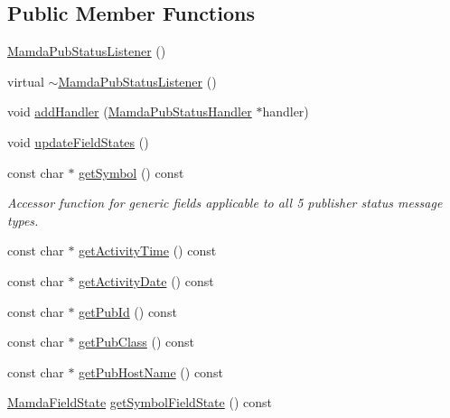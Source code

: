 \subsection*{Public Member Functions}
\begin{CompactItemize}
\item 
\hyperlink{classWombat_1_1MamdaPubStatusListener_85f58413cd22007f86b9b8c061812f05}{Mamda\-Pub\-Status\-Listener} ()
\item 
virtual \hyperlink{classWombat_1_1MamdaPubStatusListener_03f02d6928f876a1d35c39522da47f8d}{$\sim$Mamda\-Pub\-Status\-Listener} ()
\item 
void \hyperlink{classWombat_1_1MamdaPubStatusListener_8fd61b0b01ae58ac9aa0087ef361206c}{add\-Handler} (\hyperlink{classWombat_1_1MamdaPubStatusHandler}{Mamda\-Pub\-Status\-Handler} $\ast$handler)
\item 
void \hyperlink{classWombat_1_1MamdaPubStatusListener_2af5146fb7e9e8b4427e78809c20377a}{update\-Field\-States} ()
\item 
const char $\ast$ \hyperlink{classWombat_1_1MamdaPubStatusListener_6a45bb477632be814f1a3bd00082c06c}{get\-Symbol} () const 
\begin{CompactList}\small\item\em Accessor function for generic fields applicable to all 5 publisher status message types. \item\end{CompactList}\item 
const char $\ast$ \hyperlink{classWombat_1_1MamdaPubStatusListener_ffedad037842c408272dbded18f676f6}{get\-Activity\-Time} () const 
\item 
const char $\ast$ \hyperlink{classWombat_1_1MamdaPubStatusListener_0b14cc9aec4ec454b0095cf4f82fab5e}{get\-Activity\-Date} () const 
\item 
const char $\ast$ \hyperlink{classWombat_1_1MamdaPubStatusListener_48e9eaf72c6faf1bab703c5993c1adf7}{get\-Pub\-Id} () const 
\item 
const char $\ast$ \hyperlink{classWombat_1_1MamdaPubStatusListener_838ffb83c7d46bf52b743f659dd733d9}{get\-Pub\-Class} () const 
\item 
const char $\ast$ \hyperlink{classWombat_1_1MamdaPubStatusListener_0623f4d8813595a3306cb929b518664e}{get\-Pub\-Host\-Name} () const 
\item 
\hyperlink{namespaceWombat_93aac974f2ab713554fd12a1fa3b7d2a}{Mamda\-Field\-State} \hyperlink{classWombat_1_1MamdaPubStatusListener_5072c477fd34a25138e39f6fb732956b}{get\-Symbol\-Field\-State} () const 

\end{CompactItemize}
